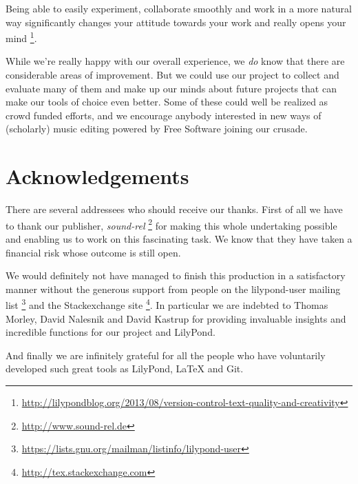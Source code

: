 \documentclass[11pt,a4paper]{article}
\begin{document}
Being able to easily experiment, collaborate smoothly and work in a more natural way
significantly changes your attitude towards your work and really opens your mind%
\footnote{\url{http://lilypondblog.org/2013/08/version-control-text-quality-and-creativity}}.

While we're really happy with our overall experience, we \emph{do} know that there are
considerable areas of improvement. But we could use our project to collect and evaluate 
many of them and make up our minds about future projects that can make our tools of choice 
even better.
Some of these could well be realized as crowd funded efforts, and we encourage anybody
interested in new ways of (scholarly) music editing powered by Free Software joining our
crusade.

\section{Acknowledgements}

There are several addressees who should receive our thanks. First of all we have to thank our publisher, \emph{sound-rel}%
\footnote{\url{http://www.sound-rel.de}} for making this whole undertaking possible and
enabling us to work on this fascinating task. We know that they have taken a financial
risk whose outcome is still open.

We would definitely not have managed to finish this production in a satisfactory manner
without the generous support from people on the lilypond-user mailing list%
\footnote{\url{https://lists.gnu.org/mailman/listinfo/lilypond-user}}
and the Stackexchange site%
\footnote{\url{http://tex.stackexchange.com}}. In particular we are indebted to
Thomas Morley, David Nalesnik and David Kastrup for providing invaluable insights and
incredible functions for our project and LilyPond.

And finally we are infinitely grateful for all the people who have voluntarily developed
such great tools as LilyPond, \LaTeX{} and Git.
\end{document}
